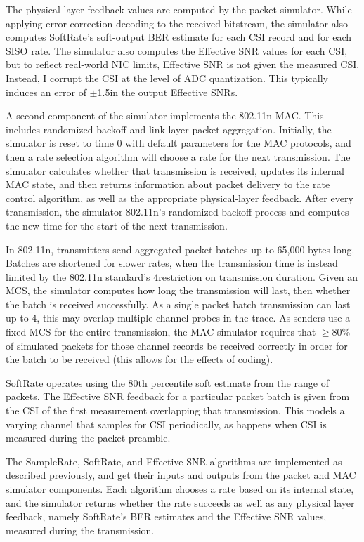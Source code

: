 The physical-layer feedback values are computed by the packet simulator. While applying error correction decoding to the received bitstream, the simulator also computes SoftRate's soft-output BER estimate for each CSI record and for each SISO rate. The simulator also computes the Effective SNR values for each CSI, but to reflect real-world NIC limits, Effective SNR is not given the measured CSI. Instead, I corrupt the CSI at the level of ADC quantization. This typically induces an error of $\pm$1.5\dB in the output Effective SNRs.

A second component of the simulator implements the 802.11n MAC. This includes randomized backoff and link-layer packet aggregation. Initially, the simulator is reset to time 0 with default parameters for the MAC protocols, and then a rate selection algorithm will choose a rate for the next transmission. The simulator calculates whether that transmission is received, updates its internal MAC state, and then returns information about packet delivery to the rate control algorithm, as well as the appropriate physical-layer feedback. After every transmission, the simulator 802.11n's randomized backoff process and computes the new time for the start of the next transmission.

In 802.11n, transmitters send aggregated packet batches up to 65,000 bytes long. Batches are shortened for slower rates, when the transmission time is instead limited by the 802.11n standard's 4\ms restriction on transmission duration. Given an MCS, the simulator computes how long the transmission will last, then whether the batch is received successfully. As a single packet batch transmission can last up to 4\ms, this may overlap multiple channel probes in the trace. As senders use a fixed MCS for the entire transmission, the MAC simulator requires that $\geq$80\% of simulated packets for those channel records be received correctly in order for the batch to be received (this allows for the effects of coding).

SoftRate operates using the 80th percentile soft estimate from the range of packets. The Effective SNR feedback for a particular packet batch is given from the CSI of the first measurement overlapping that transmission. This models a varying channel that samples for CSI periodically, as happens when CSI is measured during the packet preamble.

The SampleRate, SoftRate, and Effective SNR algorithms are implemented as described previously, and get their inputs and outputs from the packet and MAC simulator components. Each algorithm chooses a rate based on its internal state, and the simulator returns whether the rate succeeds as well as any physical layer feedback, namely SoftRate's BER estimates and the Effective SNR values, measured during the transmission.

